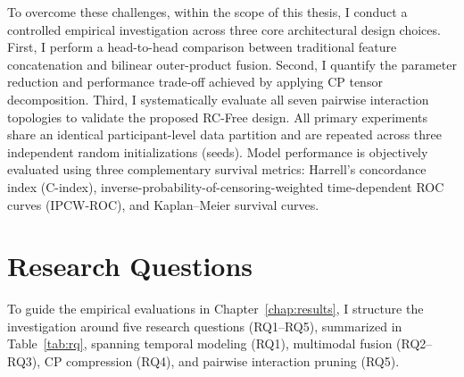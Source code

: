 To overcome these challenges, within the scope of this thesis, I conduct a controlled empirical investigation across three core architectural design choices. First, I perform a head-to-head comparison between traditional feature concatenation and bilinear outer-product fusion. Second, I quantify the parameter reduction and performance trade-off achieved by applying CP tensor decomposition. Third, I systematically evaluate all seven pairwise interaction topologies to validate the proposed RC-Free design. All primary experiments share an identical participant-level data partition and are repeated across three independent random initializations (seeds). Model performance is objectively evaluated using three complementary survival metrics: Harrell's concordance index (C-index), inverse-probability-of-censoring-weighted time-dependent ROC curves (IPCW-ROC), and Kaplan--Meier survival curves.

\section{Research Questions}
To guide the empirical evaluations in Chapter~\ref{chap:results}, I structure the investigation around five research questions (RQ1--RQ5), summarized in Table~\ref{tab:rq}, spanning temporal modeling (RQ1), multimodal fusion (RQ2--RQ3), CP compression (RQ4), and pairwise interaction pruning (RQ5).

